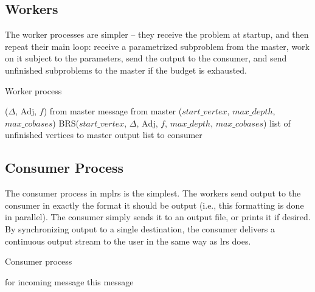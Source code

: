 \documentclass[a4paper,11pt]{article}   \usepackage{authblk} \usepackage[top=1.9cm,bottom=1.9cm,left=1.9cm,right=1.9cm]{geometry}
\newcommand{\progname}{\textsf}
\newcommand{\lrs}{\progname{lrs}\xspace}
\newcommand{\mplrs}{\progname{mplrs}\xspace}
\newcommand{\Adj}{\textrm{Adj}}
\newcommand{\mymaxdepth}{\ensuremath{\mathit{max\_depth}}\xspace}
\newcommand{\maxcobases}{\ensuremath{\mathit{max\_cobases}}\xspace}
\newcommand{\startvertex}{\ensuremath{\mathit{start\_vertex}}\xspace}
\newcommand{\mytrue}{\ensuremath{\textrm{true}}\xspace}
\begin{document}
\subsection{Workers}

The worker processes are simpler -- they receive the problem at
startup, and then repeat their main loop: receive a
parametrized subproblem from the master, work on it subject to the
parameters, send the output to the consumer, and send unfinished
subproblems to the master if the budget is exhausted.  

\begin{algorithm}[ht!]
 \caption{Worker process}
 \label{alg:mplrs_worker}
 \begin{algorithmic}[1]
    ($\Delta$, $\Adj$, $f$) from master
   \While {\mytrue}
      message from master
     \EndIf
      (\startvertex, \mymaxdepth, \maxcobases) 
      BRS(\startvertex, $\Delta$, $\Adj$, $f$, \mymaxdepth,  \maxcobases)
      list of unfinished vertices to master
      output list to consumer
   \EndWhile
  \EndProcedure
 \end{algorithmic}
\end{algorithm}

\subsection{Consumer Process}

The consumer process in \mplrs is the simplest.  The workers send output
to the consumer in exactly the format it should be output (i.e., this
formatting is done in parallel).  The consumer simply sends it to an
output file, or prints it if desired.  By synchronizing output to a
single destination, the consumer delivers a continuous output
stream to the user in the same way as 
\lrs does.

\begin{algorithm}
 \caption{Consumer process}
 \label{alg:mplrs_consumer}
 \begin{algorithmic}[1]
   \While {\mytrue}
     for incoming message
    \EndIf
     this message
   \EndWhile
  \EndProcedure
 \end{algorithmic}
\end{algorithm}
\end{document}
